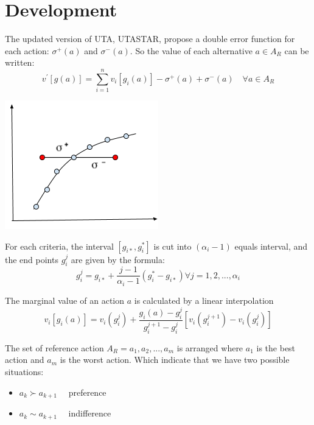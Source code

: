 \documentclass{report}
\begin{document}
\newpage
\section{Development} 
The updated version of UTA, UTASTAR, propose a double error function for each action: $\sigma ^{+} (a)$ and $\sigma ^{-} (a)$.  So the value of each alternative $a \in A_R$ can be written: \\
\begin{equation}
	v^{'} [g(a)] = \sum_{i=1}^{n} v_i [g_i (a)] - \sigma ^{+} (a)+ \sigma ^{-} (a) \quad  \forall a \in A_R
\end{equation}
\begin{center}
\includegraphics{error-function-utastar}
\end{center}

For each criteria, the interval $[g_{i*}, g_i^{*}]$ is cut into $(\alpha _i -1)$ equals interval, and the end points $g_i^{j}$ are given by the formula:
\begin{equation}
	g_i^{j}= g_{i*} + \frac{j-1}{\alpha _i -1} (g_i^{*} - g_{i*})  \forall j = 1,2, ..., \alpha _i
\end{equation}

The marginal value of an action $a$ is calculated by a linear interpolation
\begin{equation}
	v_i [g_i (a)] = v_i (g_i^{j}) + \frac{g_i (a) - g_i^{j}}{ g_i^{j+1} - g_i^{j}} [v_i (g_i^{j+1}) - v_i (g_i^{j}) ] 
\end{equation}

The set of reference action $ A_R = a_1, a_2, ... , a_m$ is arranged where $a_1$ is the best action and $a_m$ is the worst action. Which indicate that we have two possible situations:
\begin{itemize}
\item $a_k  \succ a_{k+1} \quad $ preference 
\item $a_k \sim a_{k+1} \quad $ indifference
\end{itemize} 
\end{document}

